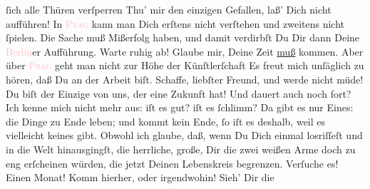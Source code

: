                ſich alle Thüren {\pb}verſperren{\dotsfour}\pend
           \pstart
           Thu’ mir den einzigen Gefallen, laß’ Dich nicht \label{K_L02699-4v}\label{K_L02699-4h} aufführen! In \textsc{\textcolor{pink}{Prag}{}\ledrightnote{\textcolor{pink}{Prag}}} kann man Dich erſtens nicht verſtehen und zweitens nicht ſpielen. Die Sache muß
               Mißerfolg haben, und damit verdirbſt Du Dir dann Deine \textcolor{pink}{Berlin}{}\ledrightnote{\textcolor{pink}{Berlin}}er Aufführung. Warte ruhig ab! Glaube mir, Deine Zeit \uline{muß} kommen. Aber über \textsc{\textcolor{pink}{Prag}{}\ledrightnote{\textcolor{pink}{Prag}}} geht man nicht zur Höhe der Künſtlerſchaft{\dotsfour}\pend
           \pstart
           Es freut mich unſäglich zu hören, daß Du an der Arbeit biſt. Schaffe, liebſter
               Freund, und werde nicht {\pb}müde! Du biſt der Einzige von
               uns, der eine Zukunft hat!\pend
           \pstart
           Und \label{K_L02699-5v}\label{K_L02699-5h} dauert auch noch fort? Ich kenne mich nicht mehr aus: iſt
               es gut? iſt es ſchlimm? Da gibt es nur Eines: die Dinge zu Ende leben; und  kommt kein Ende, ſo iſt es deshalb, weil es
               vielleicht keines gibt. Obwohl ich glaube, daß, wenn Du Dich einmal losriſſeſt und in
               die Welt hinausgingſt, die herrliche, große, Dir die zwei weißen Arme doch zu eng
               erſcheinen würden, die jetzt Deinen {\pb}Lebenskreis
               begrenzen. Verſuche es! Einen Monat! Komm hierher, oder irgendwohin! Sieh’ Dir die
